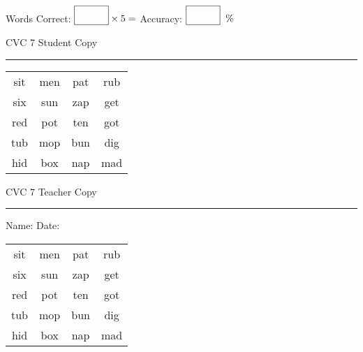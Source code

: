 \documentclass{memoir}
\begin{document}
\normalsize

Words Correct: $\fbox{\phantom{\huge 100}} \times 5 = $ Accuracy: $\fbox{\phantom{\huge 100}}\;\; \%$ 

\vfill

\newpage


\footnotesize \noindent
CVC 7 \hfill Student Copy
\smallskip
\hrule

\huge

\setlength{\tabcolsep}{14pt}
\def\arraystretch{2}

{\selectfont


\begin{vplace}[0.5]
\begin{center}
\begin{tabular}{cccc}
sit & men & pat & rub \\
six & sun & zap & get \\
red & pot & ten & got \\
tub & mop & bun & dig \\
hid & box & nap & mad \\
\end{tabular}
\end{center}
\end{vplace}

}

\newpage

\footnotesize \noindent
CVC 7 \hfill Teacher Copy
\smallskip
\hrule

\normalsize

\vfill

\noindent
Name: \underline{\hspace{1.75in}} \hfill Date: \underline{\hspace{1in}}

\huge

{\selectfont


\begin{vplace}[0.5]
\begin{center}
\begin{tabular}{cccc}
sit & men & pat & rub \\
six & sun & zap & get \\
red & pot & ten & got \\
tub & mop & bun & dig \\
hid & box & nap & mad \\
\end{tabular}
\end{center}
\end{vplace}



}
\end{document}
